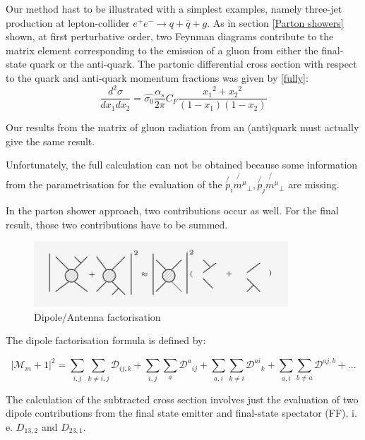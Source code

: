 Our method hast to be illustrated with a simplest examples, namely three-jet production at lepton-collider $ e^+ e^- \rightarrow q + \bar{q} + g $. As in section \ref{Parton showers} shown, at first perturbative order, two Feynman diagrams contribute to the matrix element corresponding to the emission of a gluon from either the final-state quark or the anti-quark. The partonic differential cross section with respect to the quark and anti-quark momentum fractions was given by \ref{fully}:
\begin{equation}
\frac{d^2 \sigma}{dx_1 dx_2}= \hat{\sigma_0}
\frac{\alpha_s}{2\pi} C_F \frac{{x_1}^2+{x_2}^2}{(1-x_1)(1-x_2)}
\label{confi}
\end{equation}

Our results from the matrix of gluon radiation from an (anti)quark must actually give the same result. 


Unfortunately, the full calculation can not be obtained because some information from the parametrisation for the evaluation of the $ \not{p_i} \not{m^{\mu}}_{\bot}, \not{p_j} \not{m^{\mu}}_{\bot} $  are missing. 


In the parton shower approach, two contributions occur as well. For the final result, those two contributions have to be summed. 

\begin{figure}[h!]
\centering
\includegraphics[width=0.85\textwidth]{images/Intro/factorization.png}
\caption{Dipole/Antenna factorisation}
\end{figure}


The dipole factorisation formula is defined by:

 \begin{equation}
 |\mathcal{M}_m+1|^2 = \displaystyle\sum\limits_{i,j} \displaystyle\sum\limits_{k\neq i,j} \mathcal{D}_{ij,k} +\displaystyle\sum\limits_{i,j} \displaystyle\sum\limits_{a} {\mathcal{D}^a}_{ij}+\displaystyle\sum\limits_{a,i} \displaystyle\sum\limits_{k\neq i} {\mathcal{D}^{ai}}_{k}+\displaystyle\sum\limits_{a,i} \displaystyle\sum\limits_{b\neq a} \mathcal{D}^{aj,b}+...
 \end{equation}
 
The calculation of the subtracted cross section involves just the evaluation of two dipole contributions from the final state emitter and final-state spectator (FF), i. e. $ D_{13,2} $ and $ D_{23,1} $. 

